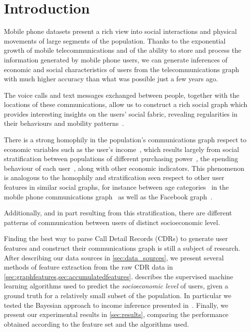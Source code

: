 \section{Introduction}

Mobile phone datasets present a rich view into social interactions and physical movements of large segments of the population. Thanks to the exponential growth of mobile telecommunications and of the ability to store and process the information generated by mobile phone users, we can generate inferences of economic and social characteristics of users from the telecommunications graph with much higher accuracy than what was possible just a few years ago.

The voice calls and text messages exchanged between people, together with the locations of these communications, allow us to construct a rich social graph which provides interesting insights on the users' social fabric, revealing regularities in their behaviours and mobility patterns~\cite{gonzalez2008understanding,ponieman2013human,sarraute2015city}.

There is a strong homophily in the population's communications graph respect to economic variables such as the user's income~\cite{fixmanasonam2016}, which results largely from social stratification between populations of different purchasing power~\cite{leo2015socioeconomic}, the spending behaviour of each user~\cite{singh2013predicting}, along with other economic indicators.
This phenomenon is analogous to the homophily and stratification seen respect to other user features in similar social graphs, for instance between age categories~\cite{mcpherson2001birds} in the mobile phone communications graph~\cite{sarraute2014} as well as the Facebook graph~\cite{ugander2011anatomy}.

Additionally, and in part resulting from this stratification, there are different patterns of communication between users of distinct socioeconomic level.

Finding the best way to parse Call Detail Records (CDRs) to generate user features and construct their communications graph is still a subject of research.  After describing our data sources in \cref{sec:data_sources}, we present several methods of feature extraction from the raw CDR data in \cref{sec:graphfeatures,sec:accumulatedfeatures}.  describes the supervised machine learning algorithms used to predict the \emph{socioeconomic level} of users, given a ground truth for a relatively small subset of the population. In particular we tested the Bayesian approach to income inference presented in~\cite{fixmanasonam2016}. Finally, we present our experimental results in \cref{sec:results}, comparing the performance obtained according to the feature set and the algorithms used.
